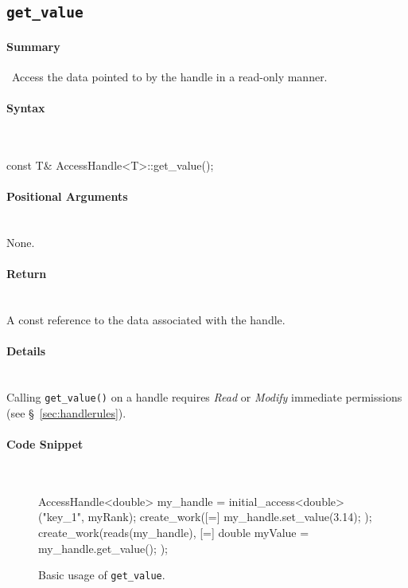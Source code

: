 \subsection{\texttt{get\_value}}

\paragraph{Summary} \mbox{}\
Access the data pointed to by the handle in a read-only manner.

\paragraph{Syntax}\mbox{}\\
\begin{CppCode}
const T& AccessHandle<T>::get_value();
\end{CppCode}

\paragraph{Positional Arguments}\mbox{}\\ 
None.

\paragraph{Return}\mbox{}\\ 
A const reference to the data associated with the handle.  

\paragraph{Details}\mbox{}\\ 
Calling \texttt{get\_value()} on a handle requires {\it Read} or {\it
Modify} immediate permissions (see \S~\ref{sec:handlerules}).


\paragraph{Code Snippet}\mbox{}\\ 
\begin{figure}[!h]
\begin{CppCodeNumb}
AccessHandle<double> my_handle = initial_access<double>("key_1", myRank);
create_work([=]{
  my_handle.set_value(3.14);
});
create_work(reads(my_handle), [=]{
  double myValue = my_handle.get_value();
});
\end{CppCodeNumb}
\label{fig:fe_api_get_value}
\caption{Basic usage of \texttt{get\_value}.}
\end{figure}


